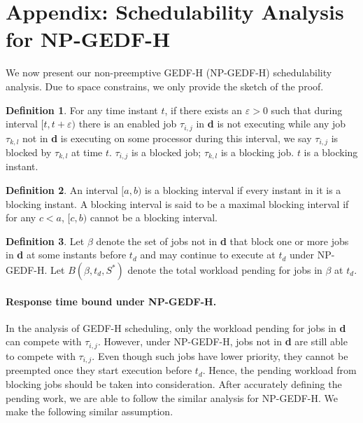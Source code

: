 \documentclass[Times, 10pt,twocolumn]{article}
\theoremstyle{definition}
\newtheorem{definition}{\textbf{Definition}}
\begin{document}
\begin{spacing}{0.1}
 

\end{spacing}

\vspace{-1mm}
\section*{Appendix: Schedulability Analysis for NP-GEDF-H}
\label{sec:NP-EDF}

We now present our non-preemptive GEDF-H (NP-GEDF-H) schedulability analysis. Due to space constrains, we only provide the sketch of the proof.

\begin{definition}
\label{def:block job*}
For any time instant $t$, if there exists an $\varepsilon > 0$ such that during interval $[t,t+\varepsilon)$ there is an enabled job $\tau_{i,j}$ in \textbf{d} is not executing while any job $\tau_{k,l}$ not in \textbf{d} is executing on some processor during this interval, we say $\tau_{i,j}$ is blocked by $\tau_{k,l}$ at time $t$. $\tau_{i,j}$ is a blocked job; $\tau_{k,l}$ is a blocking job. $t$ is a blocking instant.
\end{definition}

\begin{definition}
\label{def:block interval*}
An interval $[a,b)$ is a blocking interval if every instant in it is a blocking instant. A blocking interval is said to be a maximal blocking interval if for any $c < a$, $[c,b)$ cannot be a blocking interval.
\end{definition}
 
\begin{definition}
\label{def:BIG B*}
Let $\beta$ denote the set of jobs not in \textbf{d} that block one or more jobs in \textbf{d} at some instants before $t_d$ and may continue to execute at $t_d$ under NP-GEDF-H. Let $B(\beta, t_d, S^{*})$ denote the total workload pending for jobs in $\beta$ at $t_d$. 
\end{definition}

\paragraph{Response time bound under NP-GEDF-H.} In the analysis of GEDF-H scheduling, only the workload pending for jobs in \textbf{d} can compete with $\tau_{i,j}$. However, under NP-GEDF-H, jobs not in \textbf{d} are still able to compete with $\tau_{i,j}$. Even though such jobs have lower priority, they cannot be preempted once they start execution before $t_d$. Hence, the pending workload from blocking jobs should be taken into consideration. After accurately defining the pending work, we are able to follow the similar analysis for NP-GEDF-H. We make the following similar assumption.
\end{document}
